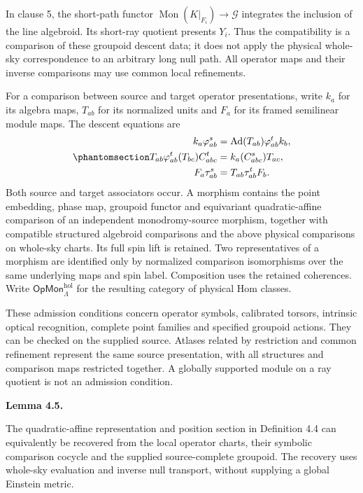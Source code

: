 \documentclass[
  english,
  11pt,
  reqno]{amsart}
\makeatletter
\newcommand{\pandocstatementheading}[1]{%
  \par\addpenalty{\@beginparpenalty}%
  \addvspace{.5\baselineskip plus .2\baselineskip minus .2\baselineskip}%
  {\normalfont\bfseries #1\par}%
  \nobreak\@afterindenttrue\@afterheading
}
\makeatother
\begin{document}
In clause 5, the short-path functor
\(\operatorname{Mon}(K|_{F_i})\to\mathcal G\) integrates the inclusion
of the line algebroid. Its short-ray quotient presents \(Y_i\). Thus the
compatibility is a comparison of these groupoid descent data; it does
not apply the physical whole-sky correspondence to an arbitrary long
null path. All operator maps and their inverse comparisons may use
common local refinements.

For a comparison between source and target operator presentations, write
\(k_a\) for its algebra maps, \(T_{ab}\) for its normalized units and
\(F_a\) for its framed semilinear module maps. The descent equations are
\begin{equation}\protect\phantomsection\label{eq:operator-source-comparison-descent}{
\begin{aligned}
k_a\varphi^s_{ab}
&=\operatorname{Ad}(T_{ab})\varphi^t_{ab}k_b,\\
T_{ab}\varphi^t_{ab}(T_{bc})C^t_{abc}
&=k_a(C^s_{abc})T_{ac},\\
F_a\tau^s_{ab}
&=T_{ab}\tau^t_{ab}F_b.
\end{aligned}
}\end{equation} Both source and target associators occur. A morphism
contains the point embedding, phase map, groupoid functor and
equivariant quadratic-affine comparison of an independent
monodromy-source morphism, together with compatible structured algebroid
comparisons and the above physical comparisons on whole-sky charts. Its
full spin lift is retained. Two representatives of a morphism are
identified only by normalized comparison isomorphisms over the same
underlying maps and spin label. Composition uses the retained
coherences. Write \(\mathsf{OpMon}^{\mathrm{hol}}_\Lambda\) for the
resulting category of physical Hom classes.

These admission conditions concern operator symbols, calibrated torsors,
intrinsic optical recognition, complete point families and specified
groupoid actions. They can be checked on the supplied source. Atlases
related by restriction and common refinement represent the same source
presentation, with all structures and comparison maps restricted
together. A globally supported module on a ray quotient is not an
admission condition.

\pandocstatementheading{\protect{}\label{lem:operator-atlas-quadratic-completion}Lemma 4.5.}

The quadratic-affine representation and position section in Definition
4.4 can equivalently be recovered from the local operator charts, their
symbolic comparison cocycle and the supplied source-complete groupoid.
The recovery uses whole-sky evaluation and inverse null transport,
without supplying a global Einstein metric.
\end{document}
